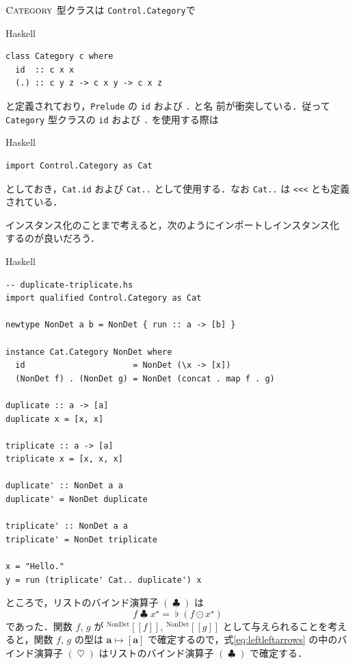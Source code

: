 \documentclass[a5paper,twoside,fleqn,draft]{jsbook}
\def\[{[\![}
\def\]{]\!]}
\newcommand{\programminglanguage}[1]{\textsf{#1}}
\newcommand{\haskell}{\programminglanguage{Haskell}}
\newcommand{\code}[1]{\texttt{#1}}
\newcommand{\filename}[1]{\texttt{#1}}
\newenvironment{haskellcode}{\begin{itembox}[r]{\haskell}}{\end{itembox}}
\DeclareMathOperator{\mBind}{\heartsuit}
\DeclareMathOperator{\mBindList}{\clubsuit}
\DeclareMathOperator{\mJoinList}{\flat} %
\DeclareMathOperator{\mMapList}{\odot}
\DeclareMathOperator{\mMapsTo}{\mapsto}
\newcommand{\mType}[1]{\mathbf{#1}} %
\newcommand{\mA}{\mType{a}}
\newcommand{\mValueConstructor}[1]{\mathrm{#1}}
\newcommand{\mValueWith}[2]{{}^\mValueConstructor{#1}\[#2\]}
\newcommand{\mTypeClass}[1]{\textsc{#1}} %
\newcommand{\mCategoryTypeClass}{\mTypeClass{Category}}
\newcommand{\mList}[1]{{#1}^\mathrm{\star}}
\begin{document}
$\mCategoryTypeClass$ 型クラスは \filename{Control.Category}で
\begin{haskellcode}
\begin{verbatim}
class Category c where
  id  :: c x x
  (.) :: c y z -> c x y -> c x z
\end{verbatim}
\end{haskellcode}
と定義されており，\filename{Prelude} の \code{id} および \code{.} と名
前が衝突している．従って \code{Category} 型クラスの \code{id} および
\code{.} を使用する際は
\begin{haskellcode}
\begin{verbatim}
import Control.Category as Cat
\end{verbatim}
\end{haskellcode}
としておき，\code{Cat.id} および \code{Cat..} として使用する．なお
\code{Cat..} は \code{<<<} とも定義されている．

インスタンス化のことまで考えると，次のようにインポートしインスタンス化
するのが良いだろう．
\begin{haskellcode}
\begin{verbatim}
-- duplicate-triplicate.hs
import qualified Control.Category as Cat

newtype NonDet a b = NonDet { run :: a -> [b] }

instance Cat.Category NonDet where
  id                      = NonDet (\x -> [x])
  (NonDet f) . (NonDet g) = NonDet (concat . map f . g)

duplicate :: a -> [a]
duplicate x = [x, x]

triplicate :: a -> [a]
triplicate x = [x, x, x]

duplicate' :: NonDet a a
duplicate' = NonDet duplicate

triplicate' :: NonDet a a
triplicate' = NonDet triplicate

x = "Hello."
y = run (triplicate' Cat.. duplicate') x
\end{verbatim}
\end{haskellcode}

ところで，リストのバインド演算子 $(\mBindList)$ は
\begin{equation}
  f\mBindList\mList{x}
  =\mJoinList(f\mMapList\mList{x})
\end{equation}
であった．関数 $f$, $g$ が $\mValueWith{NonDet}{f}$,
$\mValueWith{NonDet}{g}$ として与えられることを考えると，関数 $f$, $g$
の型は $\mA\mMapsTo[\mA]$ で確定するので，式\eqref{eq:leftleftarrows}
の中のバインド演算子 $(\mBind)$ はリストのバインド演算子
$(\mBindList)$ で確定する．
\end{document}
